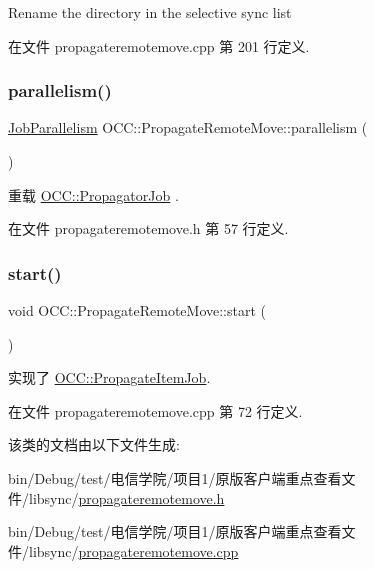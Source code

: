 Rename the directory in the selective sync list 

在文件 propagateremotemove.\+cpp 第 201 行定义.

\mbox{\label{class_o_c_c_1_1_propagate_remote_move_a489024a48010a86810fa35431fd65d9c}} 
\subsubsection{\texorpdfstring{parallelism()}{parallelism()}}
{\footnotesize\ttfamily \hyperlink{class_o_c_c_1_1_propagator_job_a2527eb0e2b598fc260a2d6449689c156}{Job\+Parallelism} O\+C\+C\+::\+Propagate\+Remote\+Move\+::parallelism (\begin{DoxyParamCaption}{ }\end{DoxyParamCaption})\hspace{0.3cm}{\ttfamily [virtual]}}



重载 \hyperlink{class_o_c_c_1_1_propagator_job_a55105e001d55177f8ccf01acecc5e637}{O\+C\+C\+::\+Propagator\+Job} .



在文件 propagateremotemove.\+h 第 57 行定义.

\mbox{\label{class_o_c_c_1_1_propagate_remote_move_a2cd9e57f880e1e408c27fad40cdeaf70}} 
\subsubsection{\texorpdfstring{start()}{start()}}
{\footnotesize\ttfamily void O\+C\+C\+::\+Propagate\+Remote\+Move\+::start (\begin{DoxyParamCaption}{ }\end{DoxyParamCaption})\hspace{0.3cm}{\ttfamily [virtual]}}



实现了 \hyperlink{class_o_c_c_1_1_propagate_item_job_a97e7a37e51ad1696f6590dd52080f10a}{O\+C\+C\+::\+Propagate\+Item\+Job}.



在文件 propagateremotemove.\+cpp 第 72 行定义.



该类的文档由以下文件生成\+:\begin{DoxyCompactItemize}
\item 
bin/\+Debug/test/电信学院/项目1/原版客户端重点查看文件/libsync/\hyperlink{propagateremotemove_8h}{propagateremotemove.\+h}\item 
bin/\+Debug/test/电信学院/项目1/原版客户端重点查看文件/libsync/\hyperlink{propagateremotemove_8cpp}{propagateremotemove.\+cpp}\end{DoxyCompactItemize}
